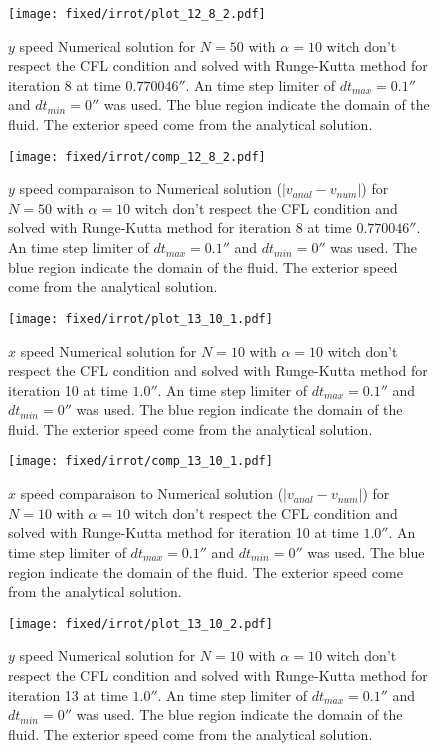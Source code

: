 \begin{figure}
\texttt{[image: fixed/irrot/plot\_12\_8\_2.pdf]}
\caption{$y$ speed Numerical solution for $N=50$ with $\alpha=10$ witch don't respect the CFL condition and solved with Runge-Kutta method
for iteration 8 at time $\unit{0.770046}{\second}$.
An time step limiter of $dt_{max}=\unit{0.1}{\second}$ and $dt_{min}=\unit{0}{\second}$ was used.
The blue region indicate the domain of the fluid. The exterior speed come from the analytical solution.
\label{fix:plot_12_8_2}
}
\end{figure}

\begin{figure}
\texttt{[image: fixed/irrot/comp\_12\_8\_2.pdf]}
\caption{$y$ speed comparaison to Numerical solution ($|v_{anal}-v_{num}|$) for $N=50$ with $\alpha=10$ witch don't respect the CFL condition and solved with Runge-Kutta method
for iteration 8 at time $\unit{0.770046}{\second}$.
An time step limiter of $dt_{max}=\unit{0.1}{\second}$ and $dt_{min}=\unit{0}{\second}$ was used.
The blue region indicate the domain of the fluid. The exterior speed come from the analytical solution.
\label{fix:comp_12_8_2}
}
\end{figure}

\clearpage

\begin{figure}
\texttt{[image: fixed/irrot/plot\_13\_10\_1.pdf]}
\caption{$x$ speed Numerical solution for $N=10$ with $\alpha=10$ witch don't respect the CFL condition and solved with Runge-Kutta method
for iteration 10 at time $\unit{1.0}{\second}$.
An time step limiter of $dt_{max}=\unit{0.1}{\second}$ and $dt_{min}=\unit{0}{\second}$ was used.
The blue region indicate the domain of the fluid. The exterior speed come from the analytical solution.
\label{fix:plot_13_10_1}
}
\end{figure}

\begin{figure}
\texttt{[image: fixed/irrot/comp\_13\_10\_1.pdf]}
\caption{$x$ speed comparaison to Numerical solution ($|v_{anal}-v_{num}|$) for $N=10$ with $\alpha=10$ witch don't respect the CFL condition and solved with Runge-Kutta method
for iteration 10 at time $\unit{1.0}{\second}$.
An time step limiter of $dt_{max}=\unit{0.1}{\second}$ and $dt_{min}=\unit{0}{\second}$ was used.
The blue region indicate the domain of the fluid. The exterior speed come from the analytical solution.
\label{fix:comp_13_10_1}
}
\end{figure}

\begin{figure}
\texttt{[image: fixed/irrot/plot\_13\_10\_2.pdf]}
\caption{$y$ speed Numerical solution for $N=10$ with $\alpha=10$ witch don't respect the CFL condition and solved with Runge-Kutta method
for iteration 13 at time $\unit{1.0}{\second}$.
An time step limiter of $dt_{max}=\unit{0.1}{\second}$ and $dt_{min}=\unit{0}{\second}$ was used.
The blue region indicate the domain of the fluid. The exterior speed come from the analytical solution.
\label{fix:plot_13_10_2}
}
\end{figure}


